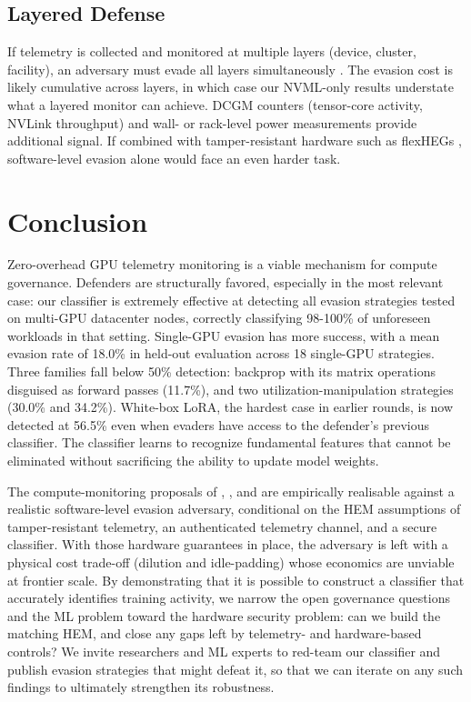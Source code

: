 \subsection{Layered Defense}

If telemetry is collected and monitored at multiple layers (device, cluster, facility), an adversary must evade all layers simultaneously \citep{ogara2025}. The evasion cost is likely cumulative across layers, in which case our NVML-only results understate what a layered monitor can achieve. DCGM counters (tensor-core activity, NVLink throughput) and wall- or rack-level power measurements provide additional signal. If combined with tamper-resistant hardware such as flexHEGs \citep{petrie2025}, software-level evasion alone would face an even harder task.

\section{Conclusion}

Zero-overhead GPU telemetry monitoring is a viable mechanism for compute governance. Defenders are structurally favored, especially in the most relevant case: our classifier is extremely effective at detecting all evasion strategies tested on multi-GPU datacenter nodes, correctly classifying 98-100\% of unforeseen workloads in that setting. Single-GPU evasion has more success, with a mean evasion rate of 18.0\% in held-out evaluation across 18 single-GPU strategies. Three families fall below 50\% detection: backprop with its matrix operations disguised as forward passes (11.7\%), and two utilization-manipulation strategies (30.0\% and 34.2\%). White-box LoRA, the hardest case in earlier rounds, is now detected at 56.5\% even when evaders have access to the defender's previous classifier. The classifier learns to recognize fundamental features that cannot be eliminated without sacrificing the ability to update model weights.

The compute-monitoring proposals of \citet{shavit2023}, \citet{baker2025}, and \citet{ogara2025} are empirically realisable against a realistic software-level evasion adversary, conditional on the HEM assumptions of tamper-resistant telemetry, an authenticated telemetry channel, and a secure classifier. With those hardware guarantees in place, the adversary is left with a physical cost trade-off (dilution and idle-padding) whose economics are unviable at frontier scale. By demonstrating that it is possible to construct a classifier that accurately identifies training activity, we narrow the open governance questions and the ML problem toward the hardware security problem: can we build the matching HEM, and close any gaps left by telemetry- and hardware-based controls? We invite researchers and ML experts to red-team our classifier and publish evasion strategies that might defeat it, so that we can iterate on any such findings to ultimately strengthen its robustness.

